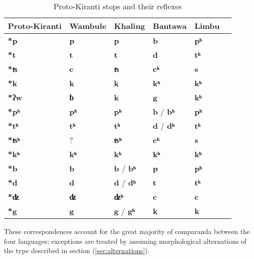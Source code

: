 \documentclass[oldfontcommands,oneside,a4paper,11pt]{article}
\newcommand{\ipa}[1]{\textbf{{\phon\mbox{#1}}}} %
\begin{document}
\begin{table}[h]
\caption{Proto-Kiranti stops and their reflexes} \centering \label{tab:stops}
\begin{tabular}{llllll}
\toprule
Proto-Kiranti & Wambule & Khaling & Bantawa & Limbu \\
\midrule
\ipa{*p} & \ipa{p} & \ipa{p} & \ipa{b} & \ipa{pʰ}  \\
\ipa{*t} & \ipa{t} & \ipa{t} & \ipa{d} & \ipa{tʰ}  \\
\ipa{*ʦ} & \ipa{c} & \ipa{ʦ} & \ipa{cʰ} & \ipa{s}  \\
\ipa{*k} & \ipa{k} & \ipa{k} & \ipa{kʰ} & \ipa{kʰ}  \\
\midrule
\ipa{*ʔw} & \ipa{ɓ} & \ipa{k} & \ipa{g} & \ipa{kʰ}  \\
\midrule
\ipa{*pʰ} & \ipa{pʰ} & \ipa{pʰ} & \ipa{b} / \ipa{bʰ}  & \ipa{pʰ}  \\
\ipa{*tʰ} & \ipa{tʰ} & \ipa{tʰ} & \ipa{d} / \ipa{dʰ} & \ipa{tʰ}  \\
\ipa{*ʦʰ} & ? & \ipa{ʦʰ} & \ipa{cʰ}  & \ipa{s}  \\
\ipa{*kʰ} & \ipa{kʰ} & \ipa{kʰ} & \ipa{kʰ} & \ipa{kʰ}  \\
\midrule
\ipa{*b} & \ipa{b} &\ipa{b} / \ipa{bʰ}  & \ipa{p} & \ipa{pʰ}  \\
\ipa{*d} & \ipa{d} & \ipa{d} / \ipa{dʰ}  & \ipa{t} & \ipa{tʰ}  \\
\ipa{*ʣ} & \ipa{ʣ} & \ipa{ʣʰ} & \ipa{c} & \ipa{c}  \\
\ipa{*g} & \ipa{g} & \ipa{g} / \ipa{gʰ}  & \ipa{k} & \ipa{k}  \\
\bottomrule
\end{tabular}
\end{table}
These correspondences account for the great majority of comparanda between the four languages; exceptions are treated by assuming  morphological alternations of the type described in section (\ref{sec:alternations}).
\end{document}
